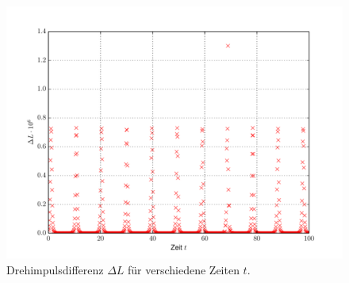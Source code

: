 \begin{figure}[H]
	\centering
	\includegraphics[width = \textwidth]{../Plots/Plot_4_Dreh.pdf}
	\caption{Drehimpulsdifferenz $\Delta L$ für verschiedene Zeiten $t$.\label{fig:Dreh}}
\end{figure}

